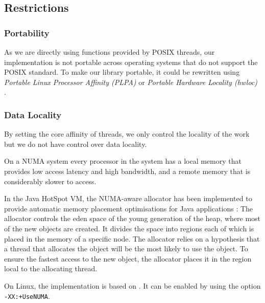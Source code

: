 \subsection{Restrictions}
\label{sec:locality-implementation-core-affinity-restrictions}

\subsubsection{Portability}

As we are directly using functions provided by POSIX threads, our
implementation is not portable across operating systems that do not
support the POSIX standard. To make our library portable, it could be
rewritten using \emph{Portable Linux Processor Affinity (PLPA)}
\cite{OpenMPI2010a} or \emph{Portable Hardware Locality (hwloc)}
\cite{OpenMPI2010}.

\subsubsection{Data Locality}

By setting the core affinity of threads, we only control the locality
of the work but we do not have control over data locality.

On a NUMA system every processor in the system has a local memory that
provides low access latency and high bandwidth, and a remote memory
that is considerably slower to access.

In the Java HotSpot VM, the NUMA-aware allocator has been implemented
to provide automatic memory placement optimisations for Java
applications \cite{Masamitsu2008, Oracle2010, Humble2010}: The
allocator controls the eden space of the young generation of the heap,
where most of the new objects are created. It divides the space into
regions each of which is placed in the memory of a specific node. The
allocator relies on a hypothesis that a thread that allocates the
object will be the most likely to use the object. To ensure the
fastest access to the new object, the allocator places it in the
region local to the allocating thread.

On Linux, the implementation is based on \cite{Kleen2004}. It can be
enabled by using the option \verb!-XX:+UseNUMA!.


